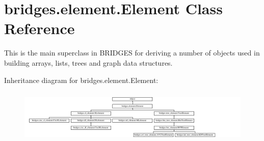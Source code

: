 \hypertarget{classbridges_1_1element_1_1_element}{}\section{bridges.\+element.\+Element Class Reference}
\label{classbridges_1_1element_1_1_element}


This is the main superclass in B\+R\+I\+D\+G\+ES for deriving a number of objects used in building arrays, lists, trees and graph data structures.  


Inheritance diagram for bridges.\+element.\+Element\+:\begin{figure}[H]
\begin{center}
\leavevmode
\includegraphics[height=2.574713cm]{classbridges_1_1element_1_1_element}
\end{center}
\end{figure}
